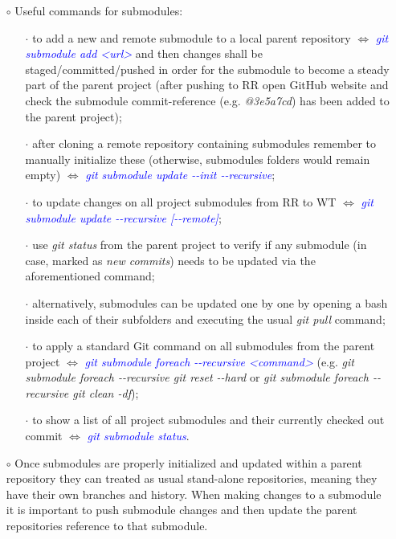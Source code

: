 \documentclass[a4paper,portrait,10pt]{article}   %
\newcommand{\mybulletlvA}{$\circ$}   %
\newcommand{\mybulletlvB}{$\cdot$}   %
\newcommand{\mydiv}{$\Leftrightarrow$ }   %
\newcommand{\mycmd}[1]{\textcolor{blue}{\textit{#1}}}   %
\newcommand{\myvspace}{\vspace{4mm}}   %
\begin{document}
\begin{itemize}
\item[\mybulletlvA] Useful commands for submodules:
\begin{itemize}
  \item[\mybulletlvB] to add a new and remote submodule to a local parent repository \mydiv \mycmd{git submodule add <url>} and then changes shall be staged/committed/pushed in order for the submodule to become a steady part of the parent project (after pushing to RR open GitHub website and check the submodule commit-reference (e.g. \textit{@3e5a7cd}) has been added to the parent project);
  \item[\mybulletlvB] after cloning a remote repository containing submodules remember to manually initialize these (otherwise, submodules folders would remain empty) \mydiv \mycmd{git submodule update -{}-init -{}-recursive};
  \item[\mybulletlvB] to update changes on all project submodules from RR to WT \mydiv \mycmd{git submodule update -{}-recursive [-{}-remote]};
  \item[\mybulletlvB] use \textit{git status} from the parent project to verify if any submodule (in case, marked as \textit{new commits}) needs to be updated via the aforementioned command;
  \item[\mybulletlvB] alternatively, submodules can be updated one by one by opening a bash inside each of their subfolders and executing the usual \textit{git pull} command;
  \item[\mybulletlvB] to apply a standard Git command on all submodules from the parent project \mydiv \mycmd{git submodule foreach -{}-recursive <command>} (e.g. \textit{git submodule foreach -{}-recursive git reset -{}-hard} or \textit{git submodule foreach -{}-recursive git clean -df});
  \item[\mybulletlvB] to show a list of all project submodules and their currently checked out commit \mydiv \mycmd{git submodule status}.
\end{itemize}
\myvspace

\item[\mybulletlvA] Once submodules are properly initialized and updated within a parent repository they can treated as usual stand-alone repositories, meaning they have their own branches and history. When making changes to a submodule it is important to push submodule changes and then update the parent repositories reference to that submodule.
\myvspace


\end{itemize}
\end{document}
